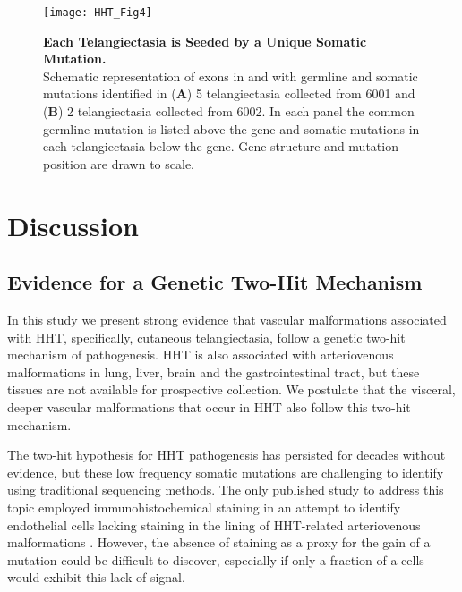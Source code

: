 \begin{sidewaysfigure}[tbp!]
\begin{center}
\texttt{[image: HHT\_Fig4]}
\end{center}

\caption[Each Telangiectasia is Seeded by a Unique Somatic Mutation.]{\textbf{Each Telangiectasia is Seeded by a Unique Somatic Mutation.} \\ Schematic representation of exons in  and  with germline and somatic mutations identified in (\textbf{A}) 5 telangiectasia collected from 6001 and (\textbf{B}) 2 telangiectasia collected from 6002. In each panel the common germline mutation is listed above the gene and somatic mutations in each telangiectasia below the gene. Gene structure and mutation position are drawn to scale. }

\label{HHT_Figure_4}
\end{sidewaysfigure}

\section{Discussion}
\subsection{Evidence for a Genetic Two-Hit Mechanism}
In this study we present strong evidence that vascular malformations associated with HHT, specifically, cutaneous telangiectasia, follow a genetic two-hit mechanism of pathogenesis. HHT is also associated with arteriovenous malformations in lung, liver, brain and the gastrointestinal tract, but these tissues are not available for prospective collection.  We postulate that the visceral, deeper vascular malformations that occur in HHT also follow this two-hit mechanism.  

The two-hit hypothesis for HHT pathogenesis has persisted for decades without evidence, but these low frequency somatic mutations are challenging to identify using traditional sequencing methods.  The only published study to address this topic employed immunohistochemical staining in an attempt to identify endothelial cells lacking staining in the lining of HHT-related arteriovenous malformations \citep{bourdeau2000}. However, the absence of staining as a proxy for the gain of a mutation could be difficult to discover, especially if only a fraction of a cells would exhibit this lack of signal.

